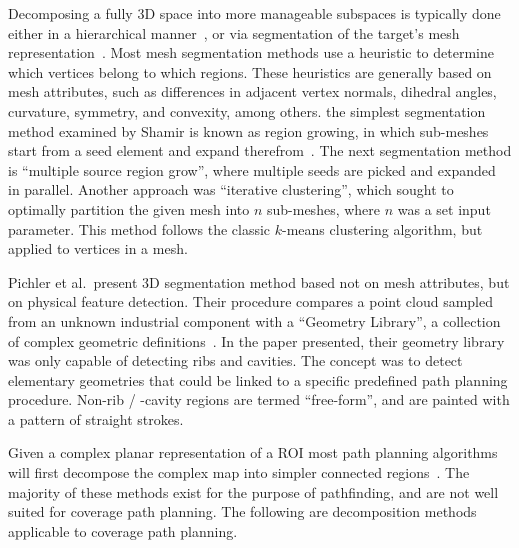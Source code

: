 Decomposing a fully 3D space into more manageable subspaces is typically done either in a hierarchical manner~\cite{HiCPP_cplx_3D_env}, or via segmentation of the target's mesh representation~\cite{Mesh_segm_technik_survey}.
Most mesh segmentation methods use a heuristic to determine which vertices belong to which regions.
These heuristics are generally based on mesh attributes, such as differences in adjacent vertex normals, dihedral angles, curvature, symmetry, and convexity, among others.
the simplest segmentation method examined by Shamir is known as region growing, in which sub-meshes start from a seed element and expand therefrom~\cite{Mesh_segm_technik_survey}.
The next segmentation method is ``multiple source region grow'', where multiple seeds are picked and expanded in parallel.
Another approach was ``iterative clustering'', which sought to optimally partition the given mesh into $n$ sub-meshes, where $n$ was a set input parameter.
This method follows the classic $k$-means clustering algorithm, but applied to vertices in a mesh.


Pichler et al.\ present 3D segmentation method based not on mesh attributes, but on physical feature detection.
Their procedure compares a point cloud sampled from an unknown industrial component with a ``Geometry Library'', a collection of complex geometric definitions~\cite{Automatic_spray_painting_unknown_parts}.
In the paper presented, their geometry library was only capable of detecting ribs and cavities.
The concept was to detect elementary geometries that could be linked to a specific predefined path planning procedure.
Non-rib / -cavity regions are termed ``free-form'', and are painted with a pattern of straight strokes.

Given a complex planar representation of a ROI most path planning algorithms will first decompose the complex map into simpler connected regions~\cite{Cell_decomposition_survey, GdR}.
The majority of these methods exist for the purpose of pathfinding, and are not well suited for coverage path planning.
The following are decomposition methods applicable to coverage path planning.

